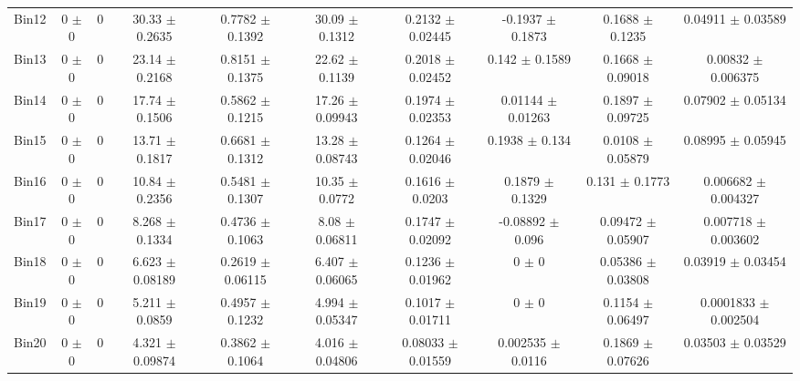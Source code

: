 \begin{tabular}{@{\extracolsep{4pt}}lccccccccc@{}}
     Bin12 & 0 $\pm$ 0 & 0 & 30.33 $\pm$ 0.2635 & 0.7782 $\pm$ 0.1392 & 30.09 $\pm$ 0.1312 & 0.2132 $\pm$ 0.02445 & -0.1937 $\pm$ 0.1873 & 0.1688 $\pm$ 0.1235 & 0.04911 $\pm$ 0.03589 \\ 
     Bin13 & 0 $\pm$ 0 & 0 & 23.14 $\pm$ 0.2168 & 0.8151 $\pm$ 0.1375 & 22.62 $\pm$ 0.1139 & 0.2018 $\pm$ 0.02452 & 0.142 $\pm$ 0.1589 & 0.1668 $\pm$ 0.09018 & 0.00832 $\pm$ 0.006375 \\ 
     Bin14 & 0 $\pm$ 0 & 0 & 17.74 $\pm$ 0.1506 & 0.5862 $\pm$ 0.1215 & 17.26 $\pm$ 0.09943 & 0.1974 $\pm$ 0.02353 & 0.01144 $\pm$ 0.01263 & 0.1897 $\pm$ 0.09725 & 0.07902 $\pm$ 0.05134 \\ 
     Bin15 & 0 $\pm$ 0 & 0 & 13.71 $\pm$ 0.1817 & 0.6681 $\pm$ 0.1312 & 13.28 $\pm$ 0.08743 & 0.1264 $\pm$ 0.02046 & 0.1938 $\pm$ 0.134 & 0.0108 $\pm$ 0.05879 & 0.08995 $\pm$ 0.05945 \\ 
     Bin16 & 0 $\pm$ 0 & 0 & 10.84 $\pm$ 0.2356 & 0.5481 $\pm$ 0.1307 & 10.35 $\pm$ 0.0772 & 0.1616 $\pm$ 0.0203 & 0.1879 $\pm$ 0.1329 & 0.131 $\pm$ 0.1773 & 0.006682 $\pm$ 0.004327 \\ 
     Bin17 & 0 $\pm$ 0 & 0 & 8.268 $\pm$ 0.1334 & 0.4736 $\pm$ 0.1063 & 8.08 $\pm$ 0.06811 & 0.1747 $\pm$ 0.02092 & -0.08892 $\pm$ 0.096 & 0.09472 $\pm$ 0.05907 & 0.007718 $\pm$ 0.003602 \\ 
     Bin18 & 0 $\pm$ 0 & 0 & 6.623 $\pm$ 0.08189 & 0.2619 $\pm$ 0.06115 & 6.407 $\pm$ 0.06065 & 0.1236 $\pm$ 0.01962 & 0 $\pm$ 0 & 0.05386 $\pm$ 0.03808 & 0.03919 $\pm$ 0.03454 \\ 
     Bin19 & 0 $\pm$ 0 & 0 & 5.211 $\pm$ 0.0859 & 0.4957 $\pm$ 0.1232 & 4.994 $\pm$ 0.05347 & 0.1017 $\pm$ 0.01711 & 0 $\pm$ 0 & 0.1154 $\pm$ 0.06497 & 0.0001833 $\pm$ 0.002504 \\ 
     Bin20 & 0 $\pm$ 0 & 0 & 4.321 $\pm$ 0.09874 & 0.3862 $\pm$ 0.1064 & 4.016 $\pm$ 0.04806 & 0.08033 $\pm$ 0.01559 & 0.002535 $\pm$ 0.0116 & 0.1869 $\pm$ 0.07626 & 0.03503 $\pm$ 0.03529 \\ 
\hline\hline
  \end{tabular}
